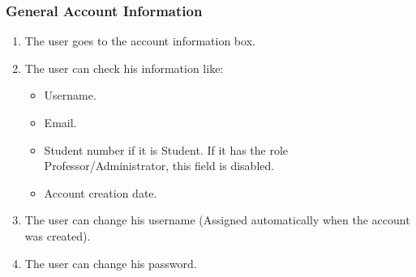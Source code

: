 \subsubsection{General Account Information}

\begin{enumerate}
    \item The user goes to the account information box.
    \item The user can check his information like:
    \begin{itemize}
        \item Username.
        \item Email.
        \item Student number if it is Student. If it has the role Professor/Administrator, this field is disabled.
        \item Account creation date.
    \end{itemize}
    \item The user can change his username (Assigned automatically when the account was created).
    \item The user can change his password.
\end{enumerate}